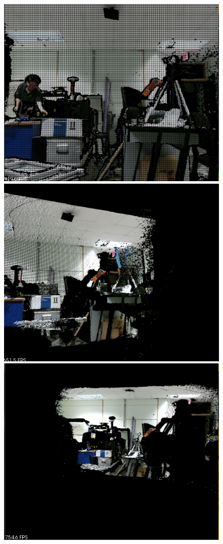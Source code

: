 \begin{figure}[H]
\centering
\includegraphics[scale=0.5]{imagenes/kinect_prueba.png}
\includegraphics[scale=0.5]{imagenes/kinect_prueba2.png}
\includegraphics[scale=0.5]{imagenes/kinect_prueba3.png}

\end{figure}
